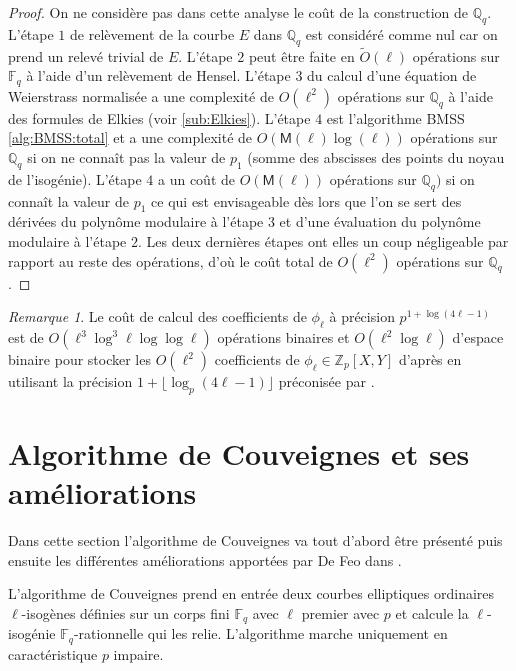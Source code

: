 \documentclass[10pt,a4paper]{book}
\theoremstyle{plain}
\theoremstyle{definition}
\theoremstyle{definition}
\theoremstyle{definition}
\theoremstyle{definition}
\theoremstyle{remark}
\newtheorem{rem}[thm]{Remarque}
\theoremstyle{remark}
\begin{document}
\begin{proof}
On ne considère pas dans cette analyse le coût de la construction de $\mathbb{Q}_q$.
L'étape $1$ de relèvement de la courbe $E$ dans $\mathbb{Q}_q$ est considéré comme nul car on prend un relevé trivial de $E$.
L'étape $2$ peut être faite en $\tilde{O}(\ell)$ opérations sur $\mathbb{F}_q$ à l'aide d'un relèvement de Hensel. 
L'étape $3$ du calcul d'une équation de Weierstrass normalisée a une complexité de $O(\ell^2)$ opérations sur $\mathbb{Q}_q$ à l'aide des formules de Elkies \cite{elkies1998} (voir \ref{sub:Elkies}).
L'étape $4$ est l'algorithme BMSS \ref{alg:BMSS:total} et a une complexité de $O(\mathsf{M}(\ell)\log(\ell))$ opérations sur $\mathbb{Q}_q$ si on ne connaît pas la valeur de $p_1$ (somme des abscisses des points du noyau de l'isogénie). L'étape $4$ a un coût de $O(\mathsf{M}(\ell))$ opérations sur $\mathbb{Q}_q)$ si on connaît la valeur de $p_1$ ce qui est envisageable dès lors que l'on se sert des dérivées du polynôme modulaire à l'étape $3$ et d'une évaluation du polynôme modulaire à l'étape $2$.
Les deux dernières étapes ont elles un coup négligeable par rapport au reste des opérations, d'où le coût total de $O(\ell^2)$ opérations sur $\mathbb{Q}_q$.
\end{proof}

\begin{rem}
Le coût de calcul des coefficients de $\phi_{\ell}$ à précision $p^{1+\log(4\ell -1)}$ est de $O(\ell^3 \log^3\ell \log\log\ell)$ opérations binaires et $O(\ell^2 \log \ell)$ d'espace binaire pour stocker les $O(\ell^2)$ coefficients de $\phi_{\ell} \in \mathbb{Z}_p[X,Y]$ d'après \cite[Algorithm 6.1, Theorem 1]{BLS12} en utilisant la précision $1+ \lfloor \log_p(4\ell-1) \rfloor$ préconisée par \cite{LairezVaccon16}.
\end{rem}


\section{Algorithme de Couveignes et ses améliorations}
Dans cette section l'algorithme de Couveignes \cite{Couveignes96} va tout d'abord être présenté puis ensuite les différentes améliorations apportées par De Feo dans \cite{DeFeo10}.

L'algorithme de Couveignes prend en entrée deux courbes elliptiques  ordinaires $\ell$-isogènes définies sur un corps fini $\mathbb{F}_q$ avec $\ell$ premier avec $p$ et calcule la $\ell$-isogénie $\mathbb{F}_q$-rationnelle qui les relie. L'algorithme marche uniquement en caractéristique $p$ impaire. 
\end{document}
